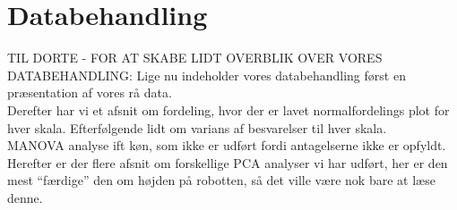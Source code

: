 \chapter{Databehandling}
\label{TestAfSkalaDatabehandling}
%
TIL DORTE - FOR AT SKABE LIDT OVERBLIK OVER VORES DATABEHANDLING: \blankline
%
Lige nu indeholder vores databehandling først en præsentation af vores rå data. \\
Derefter har vi et afsnit om fordeling, hvor der er lavet normalfordelings plot for hver skala. Efterfølgende lidt om varians af besvarelser til hver skala. \\
MANOVA analyse ift køn, som ikke er udført fordi antagelserne ikke er opfyldt.\\
Herefter er der flere afsnit om forskellige PCA analyser vi har udført, her er den mest ``færdige'' den om højden på robotten, så det ville være nok bare at læse denne. 